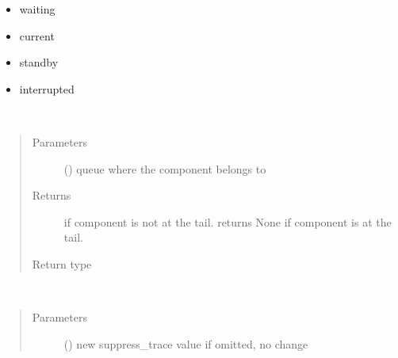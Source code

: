 \documentclass[letterpaper,10pt,english]{sphinxmanual}
\begin{document}
\begin{fulllineitems}
\begin{fulllineitems}
\begin{description}
\begin{itemize}
\item {} 
waiting

\item {} 
current

\item {} 
standby

\item {} 
interrupted

\end{itemize}

\end{description}

\end{fulllineitems}


\begin{fulllineitems}
\label{\detokenize{Reference:salabim.Component.successor}}~\begin{quote}\begin{description}
\item[{Parameters}] \leavevmode
{} ({\hyperref[\detokenize{Reference:salabim.Queue}]{}}) \textendash{} queue where the component belongs to

\item[{Returns}] \leavevmode
{} \textendash{} if component is not at the tail. 
returns None if component is at the tail.

\item[{Return type}] \leavevmode
{\hyperref[\detokenize{Reference:salabim.Component}]{}}

\end{description}\end{quote}

\end{fulllineitems}


\begin{fulllineitems}
\label{\detokenize{Reference:salabim.Component.suppress_pause_at_step}}~\begin{quote}\begin{description}
\item[{Parameters}] \leavevmode
{} () \textendash{} new suppress\_trace value 
if omitted, no change


\end{description}
\end{quote}
\end{fulllineitems}
\end{fulllineitems}
\end{document}
